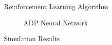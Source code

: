 \documentclass[final]{beamer}
\newlength{\onecolwid}
\begin{document}
\begin{frame}[t]
\begin{columns}[t]
\begin{column}{\onecolwid}
\begin{block}{Reinforcement Learning Algorithm}
\begin{figure}
    \centering
    \caption{ADP Neural Network}
    \label{fig:NeuralNetwork}
\end{figure}



\vskip 1.5cm


\vskip -2.5cm
\end{block}


\begin{block}{Simulation Results}
\vskip -1cm



\end{block}
\end{column}
\end{columns}
\end{frame}
\end{document}
